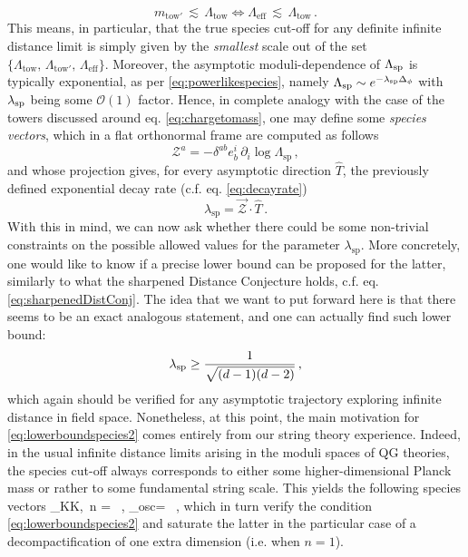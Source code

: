 %
\begin{equation}\label{eq:conforeffectivetower}
  m_{\text{tow}'}\, \lesssim\, \Lambda_{\text{tow}} \iff \Lambda_{\text{eff}}\, \lesssim\, \Lambda_{\text{tow}}\, .
\end{equation}
%
This means, in particular, that the true species cut-off for any definite infinite distance limit is simply given by the \emph{smallest} scale out of the set $\{\Lambda_{\text{tow}},\, \Lambda_{\text{tow}'},\, \Lambda_{\text{eff}}\}$. Moreover, the asymptotic moduli-dependence of $\Lambda_{\text{sp}}$ is typically exponential, as per \eqref{eq:powerlikespecies}, namely $\Lambda_{\text{sp}} \sim e^{-\lambda_{\rm sp} \Delta_{\phi}}$ with $\lambda_{\rm sp}$ being some $\mathcal{O}(1)$ factor. Hence, in complete analogy with the case of the towers discussed around eq. \eqref{eq:chargetomass}, one may define some \emph{species vectors}, which in a flat orthonormal frame are computed as follows
%
\begin{equation}\label{eq:defspeciesvectors}
  \mathcal{Z}^{a} = - \delta^{ab} e^{i}_{b} \,  \partial_{i} \log\Lambda_{\text{sp}}\, ,
\end{equation}
%
and whose projection gives, for every asymptotic direction $\hat T$, the previously defined exponential decay rate (c.f. eq. \eqref{eq:decayrate})
%
\begin{equation}\label{eq:decayratespecies}
  \lambda_{\text{sp}}=\vec{\mathcal{Z}} \cdot \hat{T}\, .
\end{equation}
%
With this in mind, we can now ask whether there could be some non-trivial constraints on the possible allowed values for the parameter $\lambda_{\text{sp}}$. More concretely, one would like to know if a precise lower bound can be proposed for the latter, similarly to what the sharpened Distance Conjecture holds, c.f. eq. \eqref{eq:sharpenedDistConj}. The idea that we want to put forward here is that there seems to be an exact analogous statement, and one can actually find such lower bound: 
%
\begin{equation}\label{eq:lowerboundspecies2}
  \lambda_{\rm sp} \geq \frac{1}{\sqrt{(d-1)(d-2)}}\, ,
\end{equation}
%
which again should be verified for any asymptotic trajectory exploring infinite distance in field space. Nonetheless, at this point, the main motivation for \eqref{eq:lowerboundspecies2} comes entirely from our string theory experience. Indeed, in the usual infinite distance limits arising in the moduli spaces of QG theories, the species cut-off always corresponds to either some higher-dimensional Planck mass or rather to some fundamental string scale. This yields the following species vectors
%
\beq\label{eq:speciesveconemodulus}
	_{{\rm KK},\, n} = \, , \qquad {}_{\rm osc}= \, ,
\eeq
%
which in turn verify the condition \eqref{eq:lowerboundspecies2} and saturate the latter in the particular case of a decompactification of one extra dimension (i.e. when $n=1$). 


